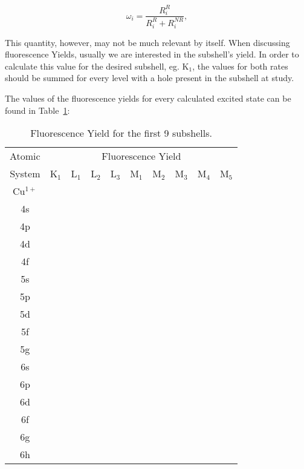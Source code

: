 \begin{equation}
    \omega_i=\frac{R_i^{R}}{R_i^{R}+R_i^{NR}},
\end{equation}

This quantity, however, may not be much relevant by itself. When discussing fluorescence Yields, usually we are interested in the subshell's yield. In order to calculate this value for the desired subshell, eg. K$_1$, the values for both rates should be summed for every level with a hole present in the subshell at study.

The values of the fluorescence yields for every calculated excited state can be found in Table~\ref{tab:FY}:

\begin{table}[h!]
    \centering
    \caption{Fluorescence Yield for the first 9 subshells.}
    \label{tab:FY}
    \begin{tabular}{c||c|c|c|c|c|c|c|c|c}
        \toprule Atomic&\multicolumn{9}{c}{Fluorescence Yield}\\
        System&K$_1$&L$_1$&L$_2$&L$_3$&M$_1$&M$_2$&M$_3$&M$_4$&M$_5$\\
        \midrule
        Cu$^{1+}$ \\ 
        4s&  \\
        4p &  &\\
        4d & &\\
        4f & \\
        5s & \\
        5p & \\
        5d & \\
        5f & \\
        5g & \\
        6s & \\
        6p & \\
        6d & \\
        6f & \\
        6g & \\
        6h\\
        \bottomrule
    \end{tabular}
\end{table}